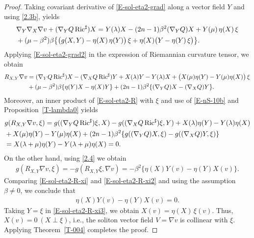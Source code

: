\documentclass[11pt,a4paper,twoside]{article}
\def\Ric{\operatorname{Ric}}
\def\tr{{\rm\,trace\,}}
\begin{document}
{\begin{proof}
Taking covariant derivative of \eqref{E-sol-eta2-grad} along a vector field $Y$ and using \eqref{2.3b}, yields
\begin{align}\label{E-sol-eta2-grad2}
\notag
 & \nabla_Y\nabla_X\nabla v + (\nabla_Y Q\Ric^\sharp)X = Y(\lambda)X - (2n-1)\beta^2 (\nabla_Y Q)X + Y(\mu)\,\eta(X)\,\xi \\
 & + (\mu-\beta^2)\beta\big\{ \big(g(X,Y) -\eta(X)\,\eta(Y)\big)\,\xi + \eta(X)\big(Y -\eta(Y)\,\xi\big)\big\} .
\end{align}
Applying \eqref{E-sol-eta2-grad2} in the expression of Riemannian curvature tensor, we obtain
\begin{align}\label{E-sol-eta2-R}
\notag
 R_{X,Y}\nabla v & = (\nabla_Y Q\Ric^\sharp)X - (\nabla_X Q\Ric^\sharp)Y
 + X(\lambda)Y - Y(\lambda)X + \big(X(\mu)\eta(Y) - Y(\mu)\eta(X)\big)\,\xi \\
 & + (\mu-\beta^2)\beta\{\eta(Y)X - \eta(X)Y\} + (2n-1)\beta^2 \{ (\nabla_Y Q)X - (\nabla_X Q)Y \} .
\end{align}
Moreover, an inner product of \eqref{E-sol-eta2-R} with $\xi$ and use of \eqref{E-nS-10b} and Proposition~\ref{T-lambda0}
yields
\begin{align}\label{E-sol-eta2-R-xi}
\notag
 & g(R_{X,Y}\nabla v, \xi) = g((\nabla_Y Q\Ric^\sharp)\xi, X) - g((\nabla_X Q\Ric^\sharp)\xi, Y) + X(\lambda)\eta(Y) - Y(\lambda)\eta(X) \\
\notag
 & + X(\mu)\eta(Y) - Y(\mu)\eta(X) + (2n-1)\beta^2 \{ g( (\nabla_Y Q)X, \xi) - g((\nabla_X Q)Y, \xi)\}  \\
& = X(\lambda+\mu)\eta(Y) - Y(\lambda+\mu)\eta(X) = 0 .
\end{align}
On the other hand, using \eqref{2.4} we obtain
\begin{align}\label{E-sol-eta2-R-xi2}
 g(R_{X,Y}\nabla v, \xi) = - g(R_{X,Y}\xi, \nabla v) = -\beta^2\{\eta(X)Y(v) - \eta(Y)X(v)\} .
\end{align}
Comparing \eqref{E-sol-eta2-R-xi} and \eqref{E-sol-eta2-R-xi2}
and using the assumption $\beta\ne0$, we conclude that
\begin{align}\label{E-sol-eta2-R-xi3}
 \eta(X)Y(v) - \eta(Y)X(v) = 0 .
\end{align}
Taking $Y=\xi$ in \eqref{E-sol-eta2-R-xi3}, we obtain
$X(v)=\eta(X)\,\xi(v)$. Thus, $X(v)=0\ (X\perp\xi)$, i.e., the soliton vector field $V=\nabla v$ is collinear with $\xi$.
Applying Theorem~\ref{T-004} completes the proof.
\end{proof}



}
\end{document}
